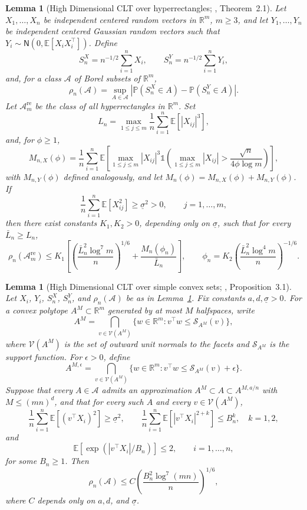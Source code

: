 \documentclass[10pt]{article}
\def\E{\mathbb{E}}
\def\P{\mathbb{P}}
\def\reals{\mathbb{R}}
\newcommand{\Indicator}{\mathds{1}}
\newtheorem{lemma}[theorem]{Lemma}
\theoremstyle{definition}
\theoremstyle{remark}
\begin{document}
\begin{lemma}[High Dimensional CLT over hyperrectangles; \cite{chernozhukov2017central}, Theorem~2.1]\label{sa-lem:hd-clt-hyperrectangles}
Let $X_1,\ldots,X_n$ be independent centered random vectors in $\reals^m$, $m\geq3$, and let $Y_1,\ldots,Y_n$ be independent centered Gaussian random vectors such that $Y_i\sim\mathsf{N}(0,\E[X_iX_i^\top])$. Define
\[
    S_n^X=n^{-1/2}\sum_{i=1}^n X_i,
    \qquad
    S_n^Y=n^{-1/2}\sum_{i=1}^n Y_i,
\]
and, for a class $\mathcal A$ of Borel subsets of $\reals^m$,
\[
    \rho_n(\mathcal A)=
    \sup_{A\in\mathcal A}
    \left|\P(S_n^X\in A)-\P(S_n^Y\in A)\right|.
\]
Let $\mathcal A_m^{\mathrm{re}}$ be the class of all hyperrectangles in $\reals^m$. Set
\[
    L_n=\max_{1\leq j\leq m}\frac{1}{n}\sum_{i=1}^n\E[|X_{ij}|^3],
\]
and, for $\phi\geq1$,
\[
    M_{n,X}(\phi)=
    \frac{1}{n}\sum_{i=1}^n
    \E\!\left[
        \max_{1\leq j\leq m}|X_{ij}|^3
        \Indicator\!\left(
            \max_{1\leq j\leq m}|X_{ij}|
            >
            \frac{\sqrt n}{4\phi\log m}
        \right)
    \right],
\]
with $M_{n,Y}(\phi)$ defined analogously, and let $M_n(\phi)=M_{n,X}(\phi)+M_{n,Y}(\phi)$. If
\[
    \frac{1}{n}\sum_{i=1}^n\E[X_{ij}^2]\geq \underline{\sigma}^2>0,
    \qquad j=1,\ldots,m,
\]
then there exist constants $K_1,K_2>0$, depending only on $\underline{\sigma}$, such that for every $\bar L_n\geq L_n$,
\[
    \rho_n(\mathcal A_m^{\mathrm{re}})
    \leq
    K_1\left[
        \left(\frac{\bar L_n^2\log^7 m}{n}\right)^{1/6}
        +
        \frac{M_n(\phi_n)}{\bar L_n}
    \right],
    \qquad
    \phi_n=K_2\left(\frac{\bar L_n^2\log^4 m}{n}\right)^{-1/6}.
\]
\end{lemma}

\begin{lemma}[High Dimensional CLT over simple convex sets; \cite{chernozhukov2017central}, Proposition~3.1]\label{sa-lem:hd-clt-simple-convex}
Let $X_i$, $Y_i$, $S_n^X$, $S_n^Y$, and $\rho_n(\mathcal A)$ be as in Lemma~\ref{sa-lem:hd-clt-hyperrectangles}. Fix constants $a,d,\underline{\sigma}>0$. For a convex polytope $A^M\subset\reals^m$ generated by at most $M$ halfspaces, write
\[
    A^M=\bigcap_{v\in\mathcal V(A^M)}
    \{w\in\reals^m:v^\top w\leq \mathcal S_{A^M}(v)\},
\]
where $\mathcal V(A^M)$ is the set of outward unit normals to the facets and $\mathcal S_{A^M}$ is the support function. For $\epsilon>0$, define
\[
    A^{M,\epsilon}=\bigcap_{v\in\mathcal V(A^M)}
    \{w\in\reals^m:v^\top w\leq \mathcal S_{A^M}(v)+\epsilon\}.
\]
Suppose that every $A\in\mathcal A$ admits an approximation $A^M\subset A\subset A^{M,a/n}$ with $M\leq(mn)^d$, and that for every such $A$ and every $v\in\mathcal V(A^M)$,
\[
    \frac{1}{n}\sum_{i=1}^n\E[(v^\top X_i)^2]\geq \underline{\sigma}^2,
    \qquad
    \frac{1}{n}\sum_{i=1}^n\E[|v^\top X_i|^{2+k}]\leq B_n^k,\quad k=1,2,
\]
and
\[
    \E[\exp(|v^\top X_i|/B_n)]\leq2,
    \qquad i=1,\ldots,n,
\]
for some $B_n\geq1$. Then
\[
    \rho_n(\mathcal A)
    \leq
    C\left(\frac{B_n^2\log^7(mn)}{n}\right)^{1/6},
\]
where $C$ depends only on $a,d$, and $\underline{\sigma}$.
\end{lemma}
\end{document}

